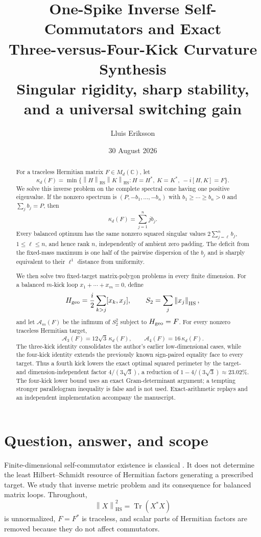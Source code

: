 \documentclass[11pt]{article}
\title{\textbf{One-Spike Inverse Self-Commutators and Exact\\Three-versus-Four-Kick Curvature Synthesis}\\[1.5mm]
\large Singular rigidity, sharp stability, and a universal switching gain}
\author{Lluis Eriksson}
\date{30 August 2026}
\theoremstyle{definition}
\theoremstyle{remark}
\newcommand{\Tr}{\operatorname{Tr}}
\newcommand{\1}{\mathbf 1}
\newcommand{\norm}[1]{\left\lVert#1\right\rVert}
\newcommand{\HS}{\mathrm{HS}}
\begin{document}
\maketitle

\begin{abstract}
For a traceless Hermitian matrix $F\in M_d(\mathbb C)$, let
\[
 \kappa_d(F)=\min\{\norm H_{\HS}\norm K_{\HS}:H=H^*,\ K=K^*,\ -i[H,K]=F\}.
\]
We solve this inverse problem on the complete spectral cone having one
positive eigenvalue.  If the nonzero spectrum is
$(P,-b_1,\ldots,-b_n)$ with $b_1\ge\cdots\ge b_n>0$ and
$\sum_jb_j=P$, then
\[
 \kappa_d(F)=\sum_{j=1}^n j b_j.
\]
Every balanced optimum has the same nonzero squared singular values
$2\sum_{j=\ell}^n b_j$, $1\le\ell\le n$, and hence rank $n$, independently
of ambient zero padding.  The deficit from the fixed-mass maximum is one half
of the pairwise dispersion of the $b_j$ and is sharply equivalent to their
$\ell^1$ distance from uniformity.

We then solve two fixed-target matrix-polygon problems in every finite
dimension.  For a balanced $m$-kick loop $x_1+\cdots+x_m=0$, define
\[
 H_{\rm geo}=\frac i2\sum_{k>j}[x_k,x_j],\qquad
 S_2=\sum_j\norm{x_j}_{\HS},
\]
and let $\mathcal A_m(F)$ be the infimum of $S_2^2$ subject to
$H_{\rm geo}=F$.  For every nonzero traceless Hermitian target,
\[
 \mathcal A_3(F)=12\sqrt3\,\kappa_d(F),\qquad
 \mathcal A_4(F)=16\,\kappa_d(F).
\]
The three-kick identity consolidates the author's earlier low-dimensional
cases, while the four-kick identity extends the previously known sign-paired
equality face to every target.  Thus a fourth kick lowers the exact optimal
squared perimeter by the target- and dimension-independent factor
$4/(3\sqrt3)$, a reduction of $1-4/(3\sqrt3)\approx23.02\%$.  The four-kick lower
bound uses an exact Gram-determinant argument; a tempting stronger
parallelogram inequality is false and is not used.  Exact-arithmetic replays
and an independent implementation accompany the manuscript.
\end{abstract}

\section{Question, answer, and scope}

Finite-dimensional self-commutator existence is classical
\cite{albert1957,thompson1958,fan1980}.  It does not determine the least
Hilbert--Schmidt resource of Hermitian factors generating a prescribed
target.  We study that inverse metric problem and its consequence for
balanced matrix loops.  Throughout,
\[
 \norm X_{\HS}^2=\Tr(X^*X)
\]
is unnormalized, $F=F^*$ is traceless, and scalar parts of Hermitian factors
are removed because they do not affect commutators.
\end{document}

